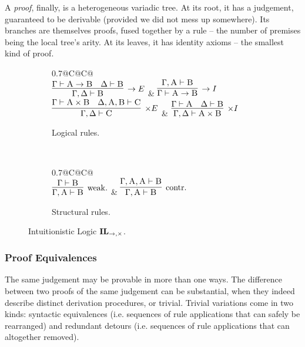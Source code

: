 A \textit{proof}, finally, is a heterogeneous variadic tree.
At its root, it has a judgement, guaranteed to be derivable (provided we did not mess up somewhere).
Its branches are themselves proofs, fused together by a rule -- the number of premises being the local tree's arity.
At its leaves, it has identity axioms -- the smallest kind of proof.

\begin{figure}
	\centering
	\begin{subfigure}{1\textwidth}
		\centering
		\begin{tabularx}{0.7\textwidth}{@{}C@{\qquad}C@{}}
		\\[\smallsep]
		$\infer[\to E]{\Gamma, \Delta \vdash \prop B}{\Gamma \vdash \prop A \to \prop B & \Delta \vdash \prop B}$ 
		& 
		$\infer[\to I]{\Gamma \vdash \prop A \to \prop B}{\Gamma, \prop A \vdash \prop B}$\\[\smallsep]
		$\infer[\times E]{\Gamma,\Delta \vdash \prop C}{\Gamma \vdash \prop A \times \prop B & \Delta, \prop A , \prop B \vdash \prop C}$ 
		&
		$\infer[\times I]{\Gamma, \Delta \vdash \prop A \times \prop B}{\Gamma \vdash \prop A & \Delta \vdash \prop B}$
		\end{tabularx}
		\caption{Logical rules.}
		\label{subfigure:intuitionistic_logic_rules:logical}
	\end{subfigure}\\[\midsep]
	\begin{subfigure}{1\textwidth}
		\centering
		\begin{tabularx}{0.7\textwidth}{@{}C@{\qquad}C@{}}
		\\[\smallsep]
		$\infer[\Weakening{}]{\Gamma, \prop A \vdash \prop B}{\Gamma \vdash \prop B} $ 
		&
		$\infer[\Contraction{}]{\Gamma, \prop A \vdash \prop B}{\Gamma, \prop A, \prop A \vdash \prop B}$
		\end{tabularx}
		\caption{Structural rules.}
		\label{subfigure:intuitionistic_logic_rules:structural}
	\end{subfigure}
	\caption{Intuitionistic Logic $\textbf{IL}_{\to,\times}$.}
	\label{figure:intuitioistic_logic_rules}
\end{figure}

\subsubsection{Proof Equivalences}
The same judgement may be provable in more than one ways.
The difference between two proofs of the same judgement can be substantial, when they indeed describe distinct derivation procedures, or trivial.
Trivial variations come in two kinds: syntactic equivalences (i.e. sequences of rule applications that can safely be rearranged) and redundant detours (i.e. sequences of rule applications that can altogether removed).

